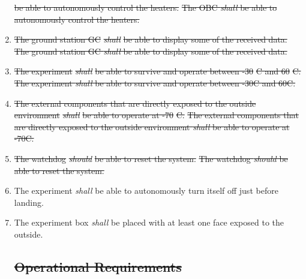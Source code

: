 \documentclass[a4paper,12pt,twoside]{article}
\providecommand{\DIFaddtex}[1]{{\protect\color{blue}\uwave{#1}}} %
\providecommand{\DIFdeltex}[1]{{\protect\color{red}\sout{#1}}}                      %
\providecommand{\DIFaddbegin}{} %
\providecommand{\DIFaddend}{} %
\providecommand{\DIFdelbegin}{} %
\providecommand{\DIFdelend}{} %
\providecommand{\DIFadd}[1]{\texorpdfstring{\DIFaddtex{#1}}{#1}} %
\providecommand{\DIFdel}[1]{\texorpdfstring{\DIFdeltex{#1}}{}} %
\newcommand{\DIFscaledelfig}{0.5}
\newlength{\DIFdelgraphicswidth} %
\newlength{\DIFdelgraphicsheight} %
\newcommand{\DIFaddincludegraphics}[2][]{{\color{blue}\fbox{\DIFOincludegraphics[#1]{#2}}}} %
\newcommand{\DIFdelincludegraphics}[2][]{%
\sbox{\DIFdelgraphicsbox}{\DIFOincludegraphics[#1]{#2}}%
\settoboxwidth{\DIFdelgraphicswidth}{\DIFdelgraphicsbox} %
\settoboxtotalheight{\DIFdelgraphicsheight}{\DIFdelgraphicsbox} %
\scalebox{\DIFscaledelfig}{%
\parbox[b]{\DIFdelgraphicswidth}{\usebox{\DIFdelgraphicsbox}\\[-\baselineskip] \rule{\DIFdelgraphicswidth}{0em}}\llap{\resizebox{\DIFdelgraphicswidth}{\DIFdelgraphicsheight}{%
\setlength{\unitlength}{\DIFdelgraphicswidth}%
\begin{picture}(1,1)%
\thicklines\linethickness{2pt} %
{\color[rgb]{1,0,0}\put(0,0){\framebox(1,1){}}}%
{\color[rgb]{1,0,0}\put(0,0){\line( 1,1){1}}}%
{\color[rgb]{1,0,0}\put(0,1){\line(1,-1){1}}}%
\end{picture}%
}\hspace*{3pt}}} %
} %
\DeclareRobustCommand{\DIFaddbegin}{\DIFOaddbegin \let\includegraphics\DIFaddincludegraphics} %
\DeclareRobustCommand{\DIFaddend}{\DIFOaddend \let\includegraphics\DIFOincludegraphics} %
\DeclareRobustCommand{\DIFdelbegin}{\DIFOdelbegin \let\includegraphics\DIFdelincludegraphics} %
\DeclareRobustCommand{\DIFdelend}{\DIFOaddend \let\includegraphics\DIFOincludegraphics} %
\begin{document}
\begin{enumerate}[label=D.\arabic*]
\DIFdel{be able to autonomously control the heaters.
    }\DIFdelend \DIFaddbegin \st{The OBC \textit{shall} be able to autonomously control the heaters.}\DIFadd{\textsuperscript{\ref{fn:unnecessary-requirement}}
    }\DIFaddend \item \DIFdelbegin \DIFdel{The ground station GC }\textit{\DIFdel{shall}} %
\DIFdel{be able to display some of the received data.
    }\DIFdelend \DIFaddbegin \st{The ground station GC \textit{shall} be able to display some of the received data.}\DIFadd{\textsuperscript{\ref{fn:unnecessary-requirement}}
    }\DIFaddend \item \DIFdelbegin \DIFdel{The experiment }\textit{\DIFdel{shall}} %
\DIFdel{be able to survive and operate between -30}%
\DIFdel{C and 60}%
\DIFdel{C.
    }\DIFdelend \DIFaddbegin \st{The experiment \textit{shall} be able to survive and operate between -30\degree C and 60\degree C.}\DIFadd{\textsuperscript{\ref{fn:unnecessary-requirement}}
    }\DIFaddend \item \DIFdelbegin \DIFdel{The external components that are directly exposed to the outside environment }\textit{\DIFdel{shall}} %
\DIFdel{be able to operate at -70}%
\DIFdel{C.
    }\DIFdelend \DIFaddbegin \st{The external components that are directly exposed to the outside environment \textit{shall} be able to operate at -70\degree C.}\DIFadd{\textsuperscript{\ref{fn:unnecessary-requirement}}
    }\DIFaddend \item \DIFdelbegin \DIFdel{The watchdog }\textit{\DIFdel{should}} %
\DIFdel{be able to reset the system.
    }\DIFdelend \DIFaddbegin \st{The watchdog \textit{should} be able to reset the system.}\DIFadd{\textsuperscript{\ref{fn:unnecessary-requirement}}
    }\DIFaddend \item The experiment \textit{shall} be able to autonomously turn itself off just before landing.
    \item The experiment box \textit{shall} be placed with at least one face exposed to the outside.
    \DIFdelbegin %
\subsection{\DIFdel{Operational Requirements}}
\addtocounter{subsection}{-1}%


\end{enumerate}
\end{document}
